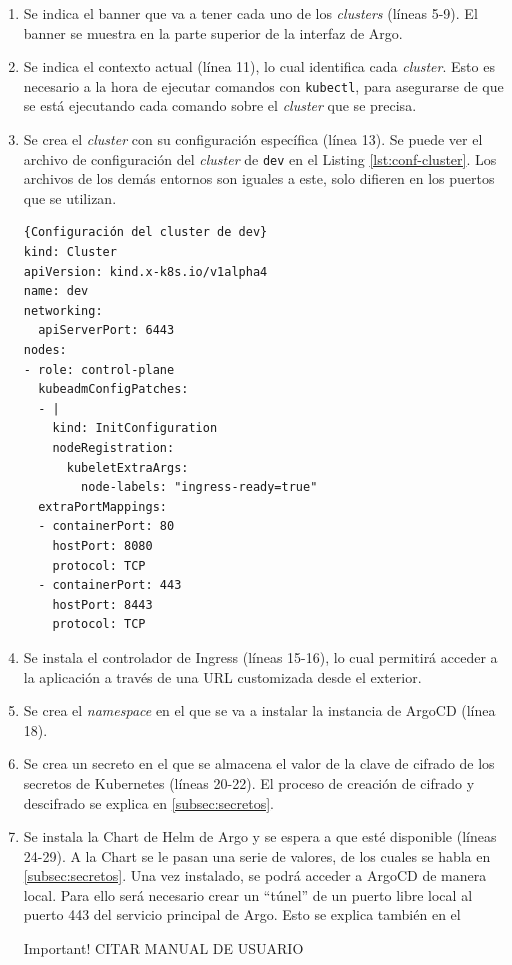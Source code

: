 \begin{enumerate}
  \item Se indica el banner que va a tener cada uno de los \textit{clusters} (líneas 5-9). El banner se muestra en la parte superior de la interfaz de Argo.
  \item Se indica el contexto actual (línea 11), lo cual identifica cada \textit{cluster}. Esto es necesario a la hora de ejecutar comandos con \texttt{kubectl}, para asegurarse de que se está ejecutando cada comando sobre el \textit{cluster} que se precisa.
  \item Se crea el \textit{cluster} con su configuración específica (línea 13). Se puede ver el archivo de configuración del \textit{cluster} de \texttt{dev} en el Listing \ref{lst:conf-cluster}. Los archivos de los demás entornos son iguales a este, solo difieren en los puertos que se utilizan.
\begin{lstlisting}[language=helm,label=lst:conf-cluster]{Configuración del cluster de dev}
kind: Cluster
apiVersion: kind.x-k8s.io/v1alpha4
name: dev
networking:
  apiServerPort: 6443
nodes:
- role: control-plane
  kubeadmConfigPatches:
  - |
    kind: InitConfiguration
    nodeRegistration:
      kubeletExtraArgs:
        node-labels: "ingress-ready=true"
  extraPortMappings:
  - containerPort: 80
    hostPort: 8080
    protocol: TCP
  - containerPort: 443
    hostPort: 8443
    protocol: TCP
\end{lstlisting}
  \item Se instala el controlador de Ingress (líneas 15-16), lo cual permitirá acceder a la aplicación a través de una URL customizada desde el exterior.
  \item Se crea el \textit{namespace} en el que se va a instalar la instancia de ArgoCD (línea 18).
  \item Se crea un secreto en el que se almacena el valor de la clave de cifrado de los secretos de Kubernetes (líneas 20-22). El proceso de creación de cifrado y descifrado se explica en \ref{subsec:secretos}.
  \item Se instala la Chart de Helm de Argo y se espera a que esté disponible (líneas 24-29). A la Chart se le pasan una serie de valores, de los cuales se habla en \ref{subsec:secretos}. Una vez instalado, se podrá acceder a ArgoCD de manera local. Para ello será necesario crear un ``túnel'' de un puerto libre local al puerto 443 del servicio principal de Argo. Esto se explica también en el
    \begin{bclogo}[logo=\bcattention]{Important!}
      CITAR MANUAL DE USUARIO

\end{bclogo}
\end{enumerate}
